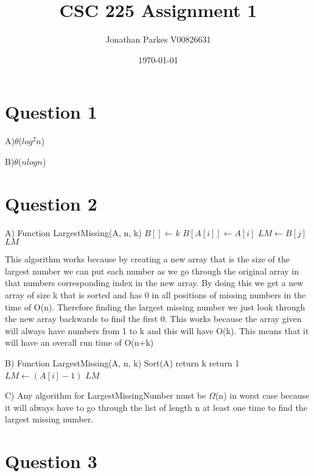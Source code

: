 \documentclass[letterpaper, 12pt]{artikel3}
\title{CSC 225 Assignment 1}
\date{ \today }
\author{Jonathan Parkes V00826631}
\begin{document}
\maketitle

\section*{Question 1}
A)$\theta$($log^{2}n$)

B)$\theta$($nlogn$)

\section*{Question 2}


\begin{algorithmic}
\STATE A)
	\STATE Function LargestMissing(A, n, k)
	\STATE $B[] \gets k$
		\STATE $B[A[i]] \gets A[i]$
	\ENDFOR
			\STATE $LM \gets B[j]$
		\ENDIF
	\ENDFOR
	\RETURN $LM$
\end{algorithmic}

This algorithm works because by creating a new array that is the size of the largest number we can put each number as we go through the original array in that numbers corresponding index in the new array.  By doing this we get a new array of size k that is sorted and has 0 in all positions of missing numbers in the time of O(n).  Therefore finding the largest missing number we just look through the new array backwards to find the first 0.  This works because the array given will always have numbers from 1 to k and this will have O(k).  This means that it will have an overall run time of O(n+k)

\pagebreak


\begin{algorithmic}
\STATE B)
	\STATE Function LargestMissing(A, n, k)
	\STATE Sort(A)
		\STATE return k
	\ENDIF
		\STATE return 1
	\ENDIF
			\STATE $LM \gets (A[i] - 1)$
		\ENDIF
	\ENDFOR
	\RETURN $LM$
\end{algorithmic}
C)
Any algorithm for LargestMissingNumber  must be $\Omega$(n)	in worst case because it will always have to go through the list of length n at least one time to find the largest missing number.	

\section*{Question 3}
\end{document}
